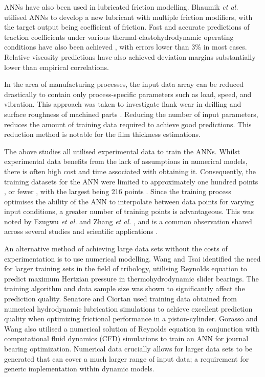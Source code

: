 ANNs have also been used in lubricated friction modelling. Bhaumik \textit{et al.} \cite{Bhaumik2019a} utilised ANNs to develop a new lubricant with multiple friction modifiers, with the target output being coefficient of friction. Fast and accurate predictions of traction coefficients under various thermal-elastohydrodynamic operating conditions have also been achieved \cite{EchavarriOtero2014}, with errors lower than 3\% in most cases. Relative viscosity predictions \cite{Afrand2016} \cite{HemmatEsfe2018} have also achieved deviation margins substantially lower than empirical correlations.

In the area of manufacturing processes, the input data array can be reduced drastically to contain only process-specific parameters such as load, speed, and vibration. This approach was taken to investigate flank wear in drilling \cite{Panda2008} and surface roughness of machined parts \cite{Asilturk2011}. Reducing the number of input parameters, reduces the amount of training data required to achieve good predictions. This reduction method is notable for the film thickness estimations.

The above studies all utilised experimental data to train the ANNs. Whilst experimental data benefits from the lack of assumptions in numerical models, there is often high cost and time associated with obtaining it. Consequently, the training datasets for the ANN were limited to approximately one hundred points \cite{Zhang2002} \cite{Hayajneh2009}, or fewer \cite{Ezugwu1995} \cite{Rutherford1996}, with the largest being 216 points \cite{Cavaleri2019}. Since the training process optimises the ability of the ANN to interpolate between data points for varying input conditions, a greater number of training points is advantageous. This was noted by Ezugwu \textit{et al.} \cite{Ezugwu1995} and Zhang \textit{et al.} \cite{Zhang2002}, and is a common observation shared across several studies and scientific applications \cite{Barbedo2018}.

An alternative method of achieving large data sets without the costs of experimentation is to use numerical modelling. Wang and Tsai \cite{Wang2020} identified the need for larger training sets in the field of tribology, utilising Reynolds equation to predict maximum Hertzian pressure in thermohydrodynamic slider bearings. The training algorithm and data sample size was shown to significantly affect the prediction quality. Senatore and Ciortan \cite{Senatore2011} used training data obtained from numerical hydrodynamic lubrication simulations to achieve excellent prediction quality when optimizing frictional performance in a piston-cylinder. Gorasso and Wang \cite{Gorasso2014} also utilised a numerical solution of Reynolds equation in conjunction with computational fluid dynamics (CFD) simulations to train an ANN for journal bearing optimization. Numerical data crucially allows for larger data sets to be generated that can cover a much larger range of input data; a requirement for generic implementation within dynamic models.

